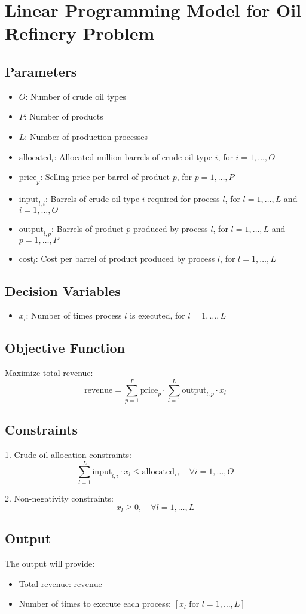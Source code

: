 \documentclass{article}
\begin{document}
\section*{Linear Programming Model for Oil Refinery Problem}

\subsection*{Parameters}
\begin{itemize}
    \item $O$: Number of crude oil types
    \item $P$: Number of products
    \item $L$: Number of production processes
    \item $\text{allocated}_i$: Allocated million barrels of crude oil type $i$, for $i = 1, \ldots, O$
    \item $\text{price}_p$: Selling price per barrel of product $p$, for $p = 1, \ldots, P$
    \item $\text{input}_{l,i}$: Barrels of crude oil type $i$ required for process $l$, for $l = 1, \ldots, L$ and $i = 1, \ldots, O$
    \item $\text{output}_{l,p}$: Barrels of product $p$ produced by process $l$, for $l = 1, \ldots, L$ and $p = 1, \ldots, P$
    \item $\text{cost}_l$: Cost per barrel of product produced by process $l$, for $l = 1, \ldots, L$
\end{itemize}

\subsection*{Decision Variables}
\begin{itemize}
    \item $x_l$: Number of times process $l$ is executed, for $l = 1, \ldots, L$
\end{itemize}

\subsection*{Objective Function}
Maximize total revenue:
\[
\text{revenue} = \sum_{p=1}^{P} \text{price}_p \cdot \sum_{l=1}^{L} \text{output}_{l,p} \cdot x_l
\]

\subsection*{Constraints}
1. Crude oil allocation constraints:
\[
\sum_{l=1}^{L} \text{input}_{l,i} \cdot x_l \leq \text{allocated}_i, \quad \forall i = 1, \ldots, O
\]

2. Non-negativity constraints:
\[
x_l \geq 0, \quad \forall l = 1, \ldots, L
\]

\subsection*{Output}
The output will provide:
\begin{itemize}
    \item Total revenue: $\text{revenue}$
    \item Number of times to execute each process: $[x_l \text{ for } l = 1, \ldots, L]$
\end{itemize}
\end{document}
